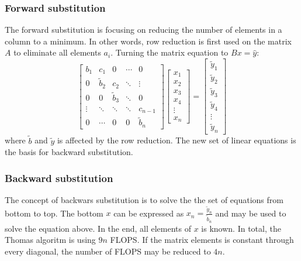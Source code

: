 \documentclass[twoside,twocolumn]{article}
\begin{document}
\subsubsection{Forward substitution}
The forward substitution is focusing on reducing the number of elements in a column to a minimum. In other words, row reduction is first used on the matrix $A$ to eliminate all elements $a_{i}$. Turning the matrix equation to $Bx=\hat{y}$:
\begin{equation*}
\begin{bmatrix}
b_1&c_1&0&\cdots &0\\
0&\tilde{b}_2&c_2& \ddots & \vdots\\
0&0&\tilde{b}_3&\ddots&0\\
\vdots&\ddots&\ddots&\ddots&c_{n-1}\\
0&\cdots&0&0&\tilde{b}_n
\end{bmatrix}
\begin{bmatrix}
x_1\\x_2\\x_3\\x_4\\\vdots\\x_{n}
\end{bmatrix}=
\begin{bmatrix}
\tilde{y}_1\\\tilde{y}_2\\\tilde{y}_3\\\tilde{y}_4\\\vdots\\\tilde{y}_{n}
\end{bmatrix} 
\end{equation*}
where $\tilde{b}$ and $\tilde{y}$ is affected by the row reduction. The new set of linear equations is the basis for backward substitution.
\subsubsection{Backward substitution}
The concept of backwars substitution is to solve the the set of equations from bottom to top. The bottom $x$ can be expressed as $x_n=\frac{\tilde{y}_n}{\tilde{b}_n}$ and may be used to solve the equation above. In the end, all elements of $x$ is known. In total, the Thomas algoritm is using $9n$ FLOPS. If the matrix elements is constant through every diagonal, the number of FLOPS may be reduced to $4n$.
\end{document}
